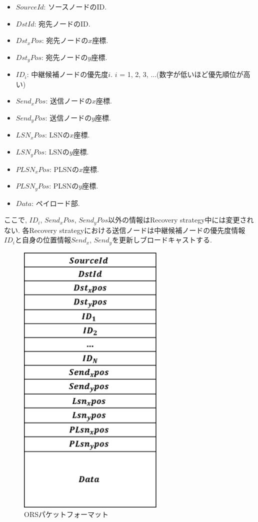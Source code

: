 \documentclass[10pt]{jreport}
\begin{document}
\begin{itemize}
	\item $SourceId$: ソースノードのID.
	\item $DstId$: 宛先ノードのID.
	\item $Dst_x Pos$: 宛先ノードの$x$座標.
	\item $Dst_y Pos$: 宛先ノードの$y$座標.
	\item $ID_i$: 中継候補ノードの優先度$i$. $i$ = 1, 2, 3, ...(数字が低いほど優先順位が高い) 
	\item $Send_x Pos$: 送信ノードの$x$座標.
	\item $Send_y Pos$: 送信ノードの$y$座標.
	\item $LSN_x Pos$: LSNの$x$座標.
	\item $LSN_y Pos$: LSNの$y$座標.
	\item $PLSN_x Pos$: PLSNの$x$座標.
	\item $PLSN_y Pos$: PLSNの$y$座標.
	\item $Data$: ペイロード部.
\end{itemize}

ここで, $ID_i$, $Send_x Pos$, $Send_y Pos$以外の情報はRecovery strategy中には変更されない. 各Recovery strategyにおける送信ノードは中継候補ノードの優先度情報$ID_i$と自身の位置情報$Send_x$, $Send_y$を更新しブロードキャストする.

\begin{figure}[!ht]
	\centering
	\includegraphics[width=70mm]{figures/ORS_packet.eps}
	\caption{ORSパケットフォーマット}
	\label{fig:ORS_packet}
\end{figure}
\end{document}
